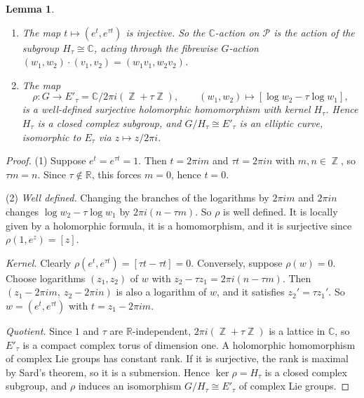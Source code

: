 \documentclass{article}
\DeclareMathOperator{\Z}{\mathbb{Z}}
\newtheorem{lemma}[theorem]{Lemma}
\theoremstyle{definition}
\theoremstyle{plain}
\newcommand{\R}{\mathbb{R}}
\newcommand{\C}{\mathbb{C}}
\begin{document}
\begin{lemma}\label{lem:Htau}
\begin{enumerate}
\item The map $t\mapsto(e^t,e^{\tau t})$ is injective. So the $\C$-action on $\mathcal P$
  is the action of the subgroup $H_\tau\cong\C$, acting through the fibrewise
  $G$-action $(w_1,w_2)\cdot(v_1,v_2)=(w_1v_1,w_2v_2)$.
\item The map
  \[\rho\colon G\to E'_\tau=\C/2\pi i(\Z+\tau\Z),\qquad (w_1,w_2)\mapsto[\log w_2-\tau\log w_1],\]
  is a well-defined surjective holomorphic homomorphism with kernel $H_\tau$. Hence $H_\tau$
  is a closed complex subgroup, and $G/H_\tau\cong E'_\tau$ is an elliptic curve,
  isomorphic to $E_\tau$ via $z\mapsto z/2\pi i$.
\end{enumerate}
\end{lemma}
\begin{proof}
(1) Suppose $e^t=e^{\tau t}=1$. Then $t=2\pi im$ and $\tau t=2\pi in$ with
$m,n\in\Z$, so $\tau m=n$. Since $\tau\notin\R$, this forces $m=0$, hence $t=0$.

(2) \emph{Well defined.} Changing the branches of the logarithms by $2\pi im$ and $2\pi in$
changes $\log w_2-\tau\log w_1$ by $2\pi i(n-\tau m)$. So $\rho$ is well defined. It is
locally given by a holomorphic formula, it is a homomorphism, and it is surjective since
$\rho(1,e^z)=[z]$.

\emph{Kernel.} Clearly $\rho(e^t,e^{\tau t})=[\tau t-\tau t]=0$. Conversely, suppose
$\rho(w)=0$. Choose logarithms $(z_1,z_2)$ of $w$ with $z_2-\tau z_1=2\pi i(n-\tau m)$. Then
$(z_1-2\pi im,\ z_2-2\pi in)$ is also a logarithm of $w$, and it satisfies
$z_2'=\tau z_1'$. So $w=(e^{t},e^{\tau t})$ with $t=z_1-2\pi im$.

\emph{Quotient.} Since $1$ and $\tau$ are $\R$-independent, $2\pi i(\Z+\tau\Z)$ is a lattice
in $\C$, so $E'_\tau$ is a compact complex torus of dimension one. A holomorphic
homomorphism of complex Lie groups has constant rank. If it is surjective, the rank is
maximal by Sard's theorem, so it is a submersion. Hence $\ker\rho=H_\tau$ is a closed
complex subgroup, and $\rho$ induces an isomorphism $G/H_\tau\cong E'_\tau$ of complex Lie
groups.
\end{proof}
\end{document}
